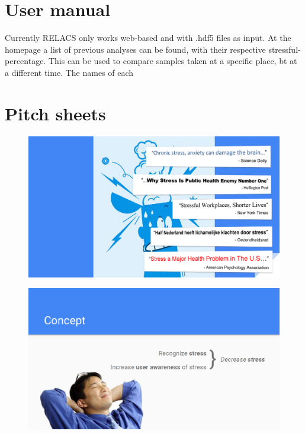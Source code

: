 \documentclass[a4paper]{article}
\begin{document}
\section{User manual}
Currently RELACS only works web-based and with .hdf5 files as input. At the homepage a list of previous analyses can be found, with their respective stressful-percentage. This can be used to compare samples taken at a specific place, bt at a different time. The names of each 



\section{Pitch sheets}

\begin{figure}[h]
\centering
\includegraphics[width=\linewidth]{./Slide1}
\label{fig:Slide1}
\end{figure}

\begin{figure}[h]
\centering
\includegraphics[width=\linewidth]{./Slide2}
\label{fig:Slide2}
\end{figure}
\end{document}
